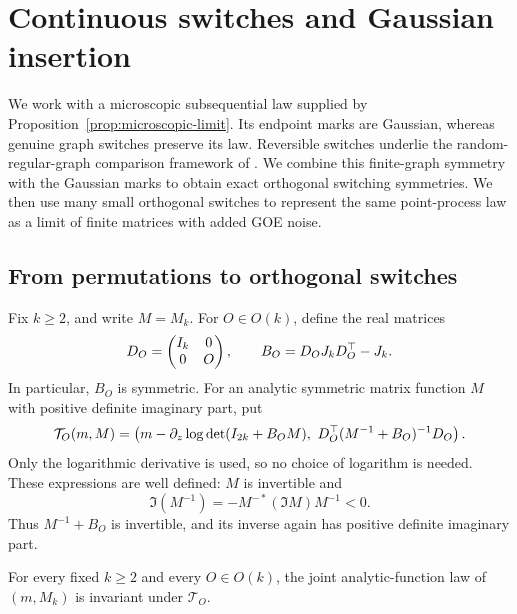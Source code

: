 \section{Continuous switches and Gaussian insertion}\label{sec:switching}

We work with a microscopic subsequential law supplied by
Proposition~\ref{prop:microscopic-limit}. Its endpoint marks are Gaussian,
whereas genuine graph switches preserve its law. Reversible switches
underlie the random-regular-graph comparison framework of
\citet[Section~3]{BauerschmidtEtAl}. We combine this finite-graph symmetry
with the Gaussian marks to obtain exact orthogonal switching symmetries.
We then use many small orthogonal switches to represent the same
point-process law as a limit of finite matrices with added GOE noise.

\subsection{From permutations to orthogonal switches}

Fix \(k\ge2\), and write \(M=M_k\). For \(O\in O(k)\), define the real matrices
\begin{equation}\label{eq:sw-definitions}
 D_O=\begin{pmatrix}I_k&0\\0&O\end{pmatrix},
 \qquad
 B_O=D_OJ_kD_O^\top-J_k.
\end{equation}
In particular, \(B_O\) is symmetric. For an analytic symmetric matrix function
\(M\) with positive definite imaginary part, put
\begin{equation}\label{eq:sw-transformation}
 \mathcal T_O(m,M)=
 \left(
 m-\partial_z\log\det(I_{2k}+B_OM),\
 D_O^\top(M^{-1}+B_O)^{-1}D_O
 \right).
\end{equation}
Only the logarithmic derivative is used, so no choice of logarithm is needed.
These expressions are well defined: \(M\) is invertible and
\[
 \Im(M^{-1})=-M^{-*}(\Im M)M^{-1}<0.
\]
Thus \(M^{-1}+B_O\) is invertible, and its inverse again has positive definite
imaginary part.

\begin{proposition}
\label{prop:continuous-switching}
For every fixed \(k\ge2\) and every \(O\in O(k)\), the joint analytic-function
law of \((m,M_k)\) is invariant under \(\mathcal T_O\).
\end{proposition}

